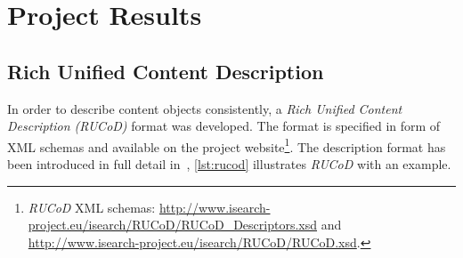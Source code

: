 \documentclass{acm_proc_article-sp}
\let\oldemph\emph
\renewcommand{\emph}[1]{\oldemph{\fontsize{9}{9}\selectfont #1}}
\newcommand{\inlinelistingsize}{\fontsize{8pt}{11pt}}
\let\oldurl\url
\renewcommand{\url}[1]{\inlinelistingsize\oldurl{#1}}
\begin{document}
\section{Project Results} \label{sec:projectresults}

\subsection{Rich Unified Content Description}
In order to describe content objects consistently, a \emph{Rich Unified Content Description \mbox{(RUCoD)}} format was developed.
The format is specified in form of XML schemas and available on the project website\footnote{\mbox{\emph{RUCoD}} XML schemas: \url{http://www.isearch-project.eu/isearch/RUCoD/RUCoD_Descriptors.xsd} and \url{http://www.isearch-project.eu/isearch/RUCoD/RUCoD.xsd}.}.
The description format has been introduced in full detail in~\cite{ijmis2010}, \autoref{lst:rucod} illustrates \mbox{\emph{RUCoD}} with an example.
\end{document}
